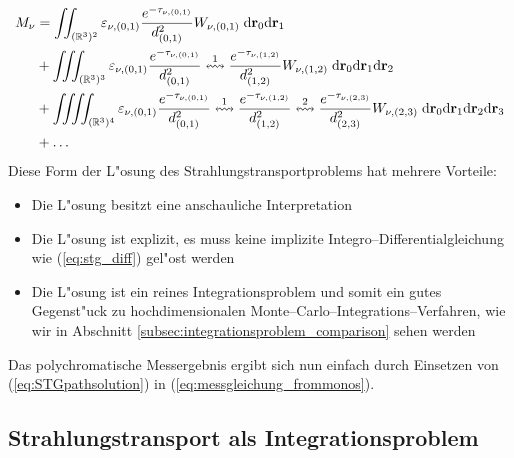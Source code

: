 	\begin{align*}
		M_\nu&=\iint_{(\mathbb{R}^3)^2}\varepsilon_{\nu,(0,1)}\frac{e^{-\tau_{\nu,(0,1)}}}{d_{(0,1)}^2} W_{\nu,(0,1)} \;\text{d}\mathbf{r}_0\text{d}\mathbf{r}_1 \\
		&+\iiint_{(\mathbb{R}^3)^3}\varepsilon_{\nu,(0,1)}\frac{e^{-\tau_{\nu,(0,1)}}}{d_{(0,1)}^2}\overset{1}{\leftrightsquigarrow}\frac{e^{-\tau_{\nu,(1,2)}}}{d_{(1,2)}^2} W_{\nu,(1,2)} \;\text{d}\mathbf{r}_0\text{d}\mathbf{r}_1\text{d}\mathbf{r}_2 \\
		&+\iiiint_{(\mathbb{R}^3)^4}\varepsilon_{\nu,(0,1)}\frac{e^{-\tau_{\nu,(0,1)}}}{d_{(0,1)}^2}\overset{1}{\leftrightsquigarrow}\frac{e^{-\tau_{\nu,(1,2)}}}{d_{(1,2)}^2}\overset{2}{\leftrightsquigarrow}\frac{e^{-\tau_{\nu,(2,3)}}}{d_{(2,3)}^2} W_{\nu,(2,3)} \;\text{d}\mathbf{r}_0\text{d}\mathbf{r}_1\text{d}\mathbf{r}_2\text{d}\mathbf{r}_3 \\
		&+\hdots
	\end{align*}
	Diese Form der L"osung des Strahlungstransportproblems hat mehrere Vorteile:
	\begin{itemize}
		\item{Die L"osung besitzt eine anschauliche Interpretation}
		\item{Die L"osung ist explizit, es muss keine implizite Integro--Differentialgleichung wie (\ref{eq:stg_diff}) gel"ost werden}
		\item{Die L"osung ist ein reines Integrationsproblem und somit ein gutes Gegenst"uck zu hochdimensionalen Monte--Carlo--Integrations--Verfahren, wie wir in Abschnitt \ref{subsec:integrationsproblem_comparison} sehen werden}
	\end{itemize}
	Das polychromatische Messergebnis ergibt sich nun einfach durch Einsetzen von (\ref{eq:STGpathsolution}) in (\ref{eq:messgleichung_frommonos}).


	\subsection{Strahlungstransport als Integrationsproblem}